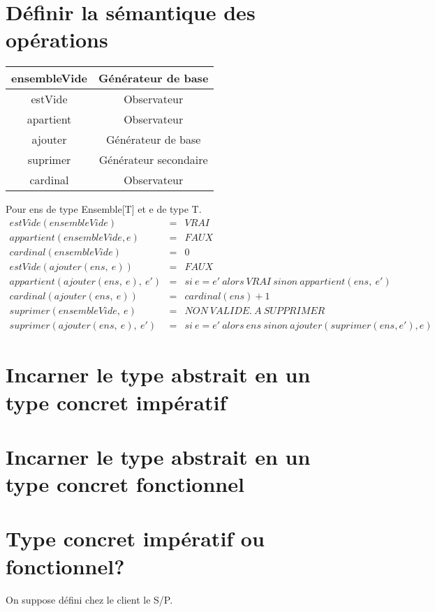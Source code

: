 \documentclass{article}
\begin{document}
	\section{Définir la sémantique des opérations}
	\begin{tabular}{|c|c|}
		\hline
			ensembleVide & Générateur de base\\
		\hline 
			estVide & Observateur \\
		\hline
			apartient & Observateur \\
		\hline
			ajouter & Générateur de base\\
		\hline
			suprimer & Générateur secondaire\\
		\hline
			cardinal & Observateur \\
		\hline	
	\end{tabular}
	\newpage
	Pour ens de type Ensemble[T] et e de type T.
	\begin{eqnarray}
		estVide(ensembleVide) &=& VRAI \\
		appartient(ensembleVide, e) &=& FAUX\\
		cardinal(ensembleVide) &=& 0\\
		estVide(ajouter(ens,~e)) &=& FAUX\\
		appartient(ajouter(ens,~e),~e') &=& si~e=e'~alors~VRAI~sinon~appartient
				(ens,~e')\\
		cardinal(ajouter(ens,~e)) &=& cardinal(ens)+1\\
		suprimer(ensembleVide,~e) &=& NON~VALIDE.~A~SUPPRIMER\\
		suprimer(ajouter(ens,~e),~e') &=& si~e=e'~alors~ens~sinon~ajouter
				(suprimer(ens,e'),e) 
	\end{eqnarray}	
	\section{Incarner le type abstrait en un type concret impératif}
		
		
	\newpage	
	\section{Incarner le type abstrait en un type concret fonctionnel}
		

	\section{Type concret impératif ou fonctionnel?}
	On suppose défini chez le client le S/P.
		
\end{document}
